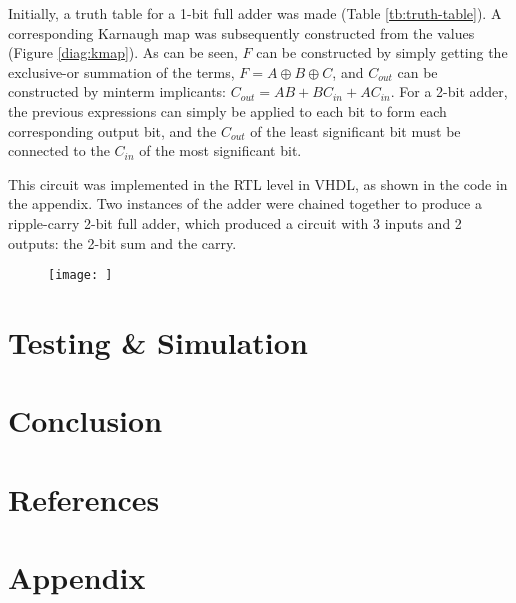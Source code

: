 \documentclass[12pt]{article}
\begin{document}
Initially, a truth table for a 1-bit full adder was made (Table \ref{tb:truth-table}).
A corresponding Karnaugh map was subsequently constructed from the values (Figure \ref{diag:kmap}).
As can be seen, $F$ can be constructed by simply getting the exclusive-or summation of the terms, $F = A \oplus B \oplus C$,
and $C_{out}$ can be constructed by minterm implicants: $C_{out} = AB + BC_{in} + AC_{in}$.
For a 2-bit adder, the previous expressions can simply be applied to each bit to form each corresponding output bit, and the $C_{out}$ of the least significant bit must be connected to the $C_{in}$ of the most significant bit.

This circuit was implemented in the RTL level in VHDL, as shown in the code in the appendix.
Two instances of the adder were chained together to produce a ripple-carry 2-bit full adder, which produced a circuit with 3 inputs and 2 outputs: the 2-bit sum and the carry.

\begin{figure}
    \texttt{[image: ]}
\end{figure}



\section{Testing \& Simulation}

\section{Conclusion}

\section{References}

\pagebreak
\section{Appendix}

\renewcommand{\thepage}{}
\end{document}
